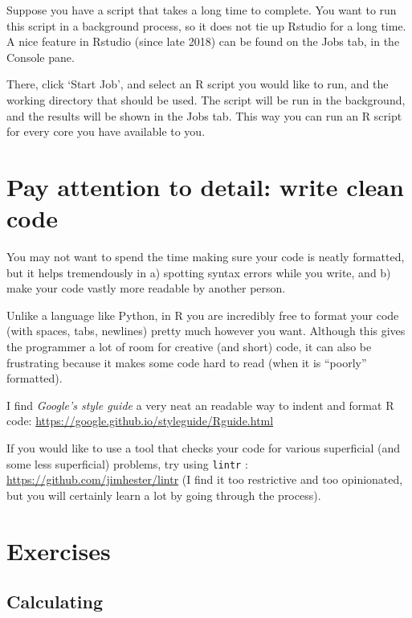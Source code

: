 \documentclass[]{book}
\let\BeginKnitrBlock\begin \let\EndKnitrBlock\end
\begin{document}
Suppose you have a script that takes a long time to complete. You want to run this script in a background process, so it does not tie up Rstudio for a long time. A nice feature in Rstudio (since late 2018) can be found on the Jobs tab, in the Console pane.

There, click `Start Job', and select an R script you would like to run, and the working directory that should be used. The script will be run in the background, and the results will be shown in the Jobs tab. This way you can run an R script for every core you have available to you.

\hypertarget{pay-attention-to-detail-write-clean-code}{%
\section{Pay attention to detail: write clean code}\label{pay-attention-to-detail-write-clean-code}}

You may not want to spend the time making sure your code is neatly formatted, but it helps tremendously in a) spotting syntax errors while you write, and b) make your code vastly more readable by another person.

Unlike a language like Python, in R you are incredibly free to format your code (with spaces, tabs, newlines) pretty much however you want. Although this gives the programmer a lot of room for creative (and short) code, it can also be frustrating because it makes some code hard to read (when it is ``poorly'' formatted).

\BeginKnitrBlock{rmdreading}
I find \emph{Google's style guide} a very neat an readable way to indent and format R code: \url{https://google.github.io/styleguide/Rguide.html}
\EndKnitrBlock{rmdreading}

\BeginKnitrBlock{rmdtry}
If you would like to use a tool that checks your code for various superficial (and some less superficial) problems, try using \texttt{lintr} : \url{https://github.com/jimhester/lintr} (I find it too restrictive and too opinionated, but you will certainly learn a lot by going through the process).
\EndKnitrBlock{rmdtry}

\hypertarget{exercises}{%
\section{Exercises}\label{exercises}}

\hypertarget{calculating}{%
\subsection{Calculating}\label{calculating}}
\end{document}
